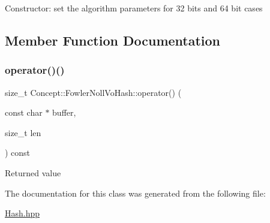 Constructor\+: set the algorithm parameters for 32 bits and 64 bit cases 

\subsection{Member Function Documentation}
\mbox{\label{class_concept_1_1_fowler_noll_vo_hash_a84663d745717952aa7a677a5a7c557c1}} 
\subsubsection{\texorpdfstring{operator()()}{operator()()}}
{\footnotesize\ttfamily size\+\_\+t Concept\+::\+Fowler\+Noll\+Vo\+Hash\+::operator() (\begin{DoxyParamCaption}\item[{const char $\ast$}]{buffer,  }\item[{size\+\_\+t}]{len }\end{DoxyParamCaption}) const\hspace{0.3cm}{\ttfamily [inline]}}

Returned value 

The documentation for this class was generated from the following file\+:\begin{DoxyCompactItemize}
\item 
\mbox{\hyperlink{_hash_8hpp}{Hash.\+hpp}}\end{DoxyCompactItemize}
